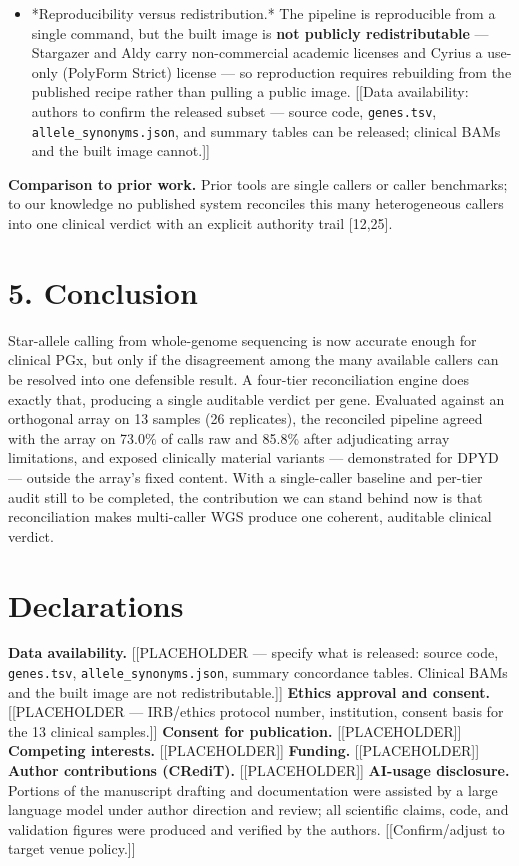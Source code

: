 \documentclass[11pt]{article}
\begin{document}
\begin{itemize}
\item *Reproducibility versus redistribution.* The pipeline is reproducible from a single command, but the built image is \textbf{not publicly redistributable} --- Stargazer and Aldy carry non-commercial academic licenses and Cyrius a use-only (PolyForm Strict) license --- so reproduction requires rebuilding from the published recipe rather than pulling a public image. [[Data availability: authors to confirm the released subset --- source code, \texttt{genes.tsv}, \texttt{allele\_synonyms.json}, and summary tables can be released; clinical BAMs and the built image cannot.]]
\end{itemize}

\textbf{Comparison to prior work.} Prior tools are single callers or caller benchmarks; to our knowledge no published system reconciles this many heterogeneous callers into one clinical verdict with an explicit authority trail [12,25].


\section*{5. Conclusion}

Star-allele calling from whole-genome sequencing is now accurate enough for clinical PGx, but only if the disagreement among the many available callers can be resolved into one defensible result. A four-tier reconciliation engine does exactly that, producing a single auditable verdict per gene. Evaluated against an orthogonal array on 13 samples (26 replicates), the reconciled pipeline agreed with the array on 73.0\% of calls raw and 85.8\% after adjudicating array limitations, and exposed clinically material variants --- demonstrated for DPYD --- outside the array's fixed content. With a single-caller baseline and per-tier audit still to be completed, the contribution we can stand behind now is that reconciliation makes multi-caller WGS produce one coherent, auditable clinical verdict.


\section*{Declarations}

\textbf{Data availability.} [[PLACEHOLDER --- specify what is released: source code, \texttt{genes.tsv}, \texttt{allele\_synonyms.json}, summary concordance tables. Clinical BAMs and the built image are not redistributable.]]
\textbf{Ethics approval and consent.} [[PLACEHOLDER --- IRB/ethics protocol number, institution, consent basis for the 13 clinical samples.]]
\textbf{Consent for publication.} [[PLACEHOLDER]]
\textbf{Competing interests.} [[PLACEHOLDER]]
\textbf{Funding.} [[PLACEHOLDER]]
\textbf{Author contributions (CRediT).} [[PLACEHOLDER]]
\textbf{AI-usage disclosure.} Portions of the manuscript drafting and documentation were assisted by a large language model under author direction and review; all scientific claims, code, and validation figures were produced and verified by the authors. [[Confirm/adjust to target venue policy.]]
\end{document}
